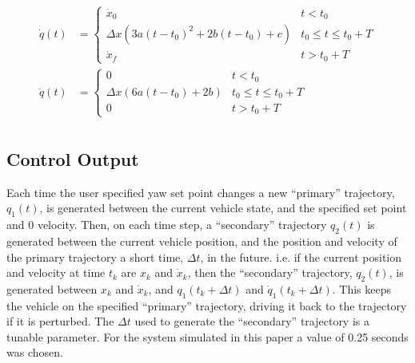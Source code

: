 \documentclass[applsci,article,submit,pdftex,moreauthors]{Definitions/mdpi}
\begin{document}
\begin{paracol}{2}
\begin{linenomath}
\begin{align}
  \dot{q}(t) &=
  \begin{cases}
    \dot{x}_0 & t < t_0\\
    \Delta x(3a(t - t_0)^2 + 2b(t - t_0) + c) & t_0 \leq t \leq t_0 + T\\
    \dot{x}_f& t > t_0 + T
  \end{cases} \label{eq:q_dot}\\
  \ddot{q}(t) &=
  \begin{cases}
    0 & t < t_0\\
    \Delta x(6a(t - t_0) + 2b)  & t_0 \leq t \leq t_0 + T\\
    0 & t > t_0 + T
  \end{cases} \label{eq:q_ddot}\\   
\end{align}
\end{linenomath}
\subsection{Control Output}
Each time the user specified yaw set point changes a new ``primary'' trajectory, $q_1(t)$, is generated between the current vehicle state, and the specified set point and 0 velocity. Then, on each time step, a ``secondary'' trajectory $q_2(t)$ is generated between the current vehicle position, and the position and velocity of the primary trajectory a short time, $\Delta t$, in the future. i.e. if the current position and velocity at time $t_k$ are $x_k$ and $\dot{x}_k$, then the ``secondary'' trajectory, $q_2(t)$, is generated between  $x_k$ and $\dot{x}_k$, and $q_1(t_k + \Delta t)$ and $\dot{q}_1(t_k + \Delta t)$. This keeps the vehicle on the specified ``primary'' trajectory, driving it back to the trajectory if it is perturbed. The $\Delta t$ used to generate the ``secondary'' trajectory is a tunable parameter. For the system simulated in this paper a value of 0.25 seconds was chosen.


\end{paracol}
\end{document}
